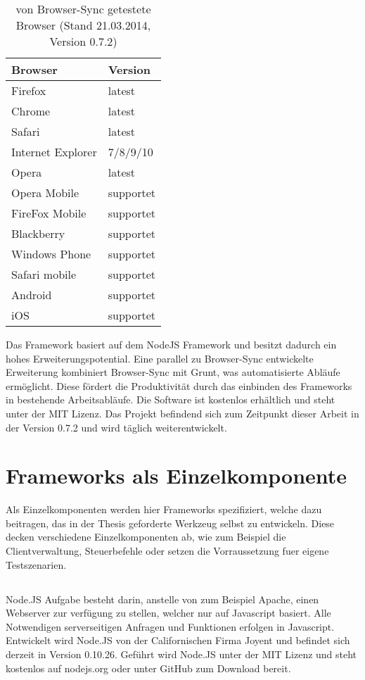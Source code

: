 		\begin{table}[H]
 		\centering
			\begin{tabular}{| p{5cm} | p{5cm} |}
			
			\hline
				Browser 	& 	Version\\
			\hline
			\hline
				Firefox	&	latest\\
				Chrome	&	latest\\
				Safari	&	latest\\
				Internet Explorer	&	7/8/9/10\\
				Opera	&	latest\\
				Opera Mobile	&	supportet\\
				FireFox Mobile	&	supportet\\
				Blackberry	&	supportet\\
				Windows Phone	&	supportet\\
				Safari mobile	&	supportet\\	
				Android	&	supportet\\
				iOS		&	supportet\\
				\hline
				\end{tabular}
			\caption{von Browser-Sync getestete Browser (Stand 21.03.2014, Version 0.7.2)}
	\end{table}
	
	Das Framework basiert auf dem NodeJS Framework und besitzt dadurch ein hohes Erweiterungspotential. Eine parallel zu 		Browser-Sync entwickelte Erweiterung kombiniert Browser-Sync mit Grunt, was automatisierte Abläufe ermöglicht. Diese fördert 	die Produktivität durch das einbinden des Frameworks in bestehende Arbeitsabläufe. Die Software ist kostenlos erhältlich und 		steht unter der MIT Lizenz. Das Projekt befindend sich zum Zeitpunkt dieser Arbeit in der Version 0.7.2 und wird täglich 			weiterentwickelt.

\pagebreak
\section{Frameworks als Einzelkomponente}
	Als Einzelkomponenten werden hier Frameworks spezifiziert, welche dazu beitragen, das in der Thesis geforderte Werkzeug 		selbst zu entwickeln. Diese decken verschiedene Einzelkomponenten ab, wie zum Beispiel die Clientverwaltung, Steuerbefehle 	oder setzen die Vorraussetzung fuer eigene Testszenarien.
	
	\subsection{}
	Node.JS Aufgabe besteht darin, anstelle von zum Beispiel Apache, einen Webserver zur verfügung zu stellen, welcher nur auf 		Javascript basiert. Alle Notwendigen serverseitigen Anfragen und Funktionen erfolgen in Javascript. Entwickelt wird Node.JS von 	der Californischen Firma Joyent und befindet sich derzeit in Version 0.10.26. Geführt wird Node.JS unter der MIT Lizenz und 		steht kostenlos auf nodejs.org oder unter GitHub zum Download bereit.
	
